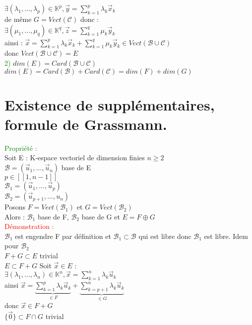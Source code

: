 \documentclass{article}
\begin{document}
$\exists (\lambda_1,..., \lambda_p)\in \mathbb K^p, \vec y=\sum_{k=1}^p \lambda_k \vec x_k$ \\
de même $G=Vect(\mathcal C)$ donc : \\
$\exists (\mu_1,..., \mu_q)\in \mathbb K^q, \vec z=\sum_{k=1}^q \mu_k \vec y_k$ \\
ainsi : $ \vec x =\sum_{k=1}^p \lambda_k \vec x_k +\sum_{k=1}^q \mu_k \vec y_k \in Vect(\mathcal B \cup \mathcal C)$ \\
donc $Vect(\mathcal B \cup \mathcal C)=E$ \\
\textcolor{green}{2)} $dim(E)= Card (\mathcal B \cup \mathcal C)$ \\
$dim(E)= Card (\mathcal B) + Card (\mathcal C)=dim(F)+dim(G)$
\section{Existence de supplémentaires, formule de Grassmann.}
\textcolor{green}{Propriété :} \\
Soit E : K-espace vectoriel de dimension finies $n \geq 2$ \\
$\mathcal B=(\vec u_1,..., \vec u_n)$ base de E \\
$p \in [[1,n-1]]$ \\
$\mathcal B_1=(\vec u_1,..., \vec u_p)$ \\
$\mathcal B_2=(\vec u_{p+1},...,u_n)$ \\
Posons $F=Vect(\mathcal B_1)$ et $G=Vect(\mathcal B_2)$ \\
Alors : $\mathcal B_1$ base de F, $\mathcal B_2$ base de G et $E= F \oplus G$ \\
\textcolor{red}{Démonstration :} \\
$\mathcal B_1$ est engendre F par définition et $\mathcal B_1 \subset \mathcal B$ qui est libre donc $\mathcal B_1$ est libre. Idem pour $\mathcal B_2$ \\
{\boldmath $F+G \subset E$} trivial \\
{\boldmath $E \subset F+G$} Soit $\vec x \in E$ : \\
$\exists (\lambda_1,...,\lambda_n) \in \mathbb K^n, \vec x= \sum_{k=1}^n \lambda_k \vec u_k$ \\
ainsi $\vec x= \underbrace{ \sum_{k=1}^p \lambda_k \vec u_k}_{\in F} + \underbrace{\sum_{k=p+1}^n \lambda_k \vec u_k}_{\in G}$ \\
donc $\vec x \in F + G$ \\
{\boldmath $\lbrace \vec 0 \rbrace \subset F \cap G$} trivial \\
\end{document}
